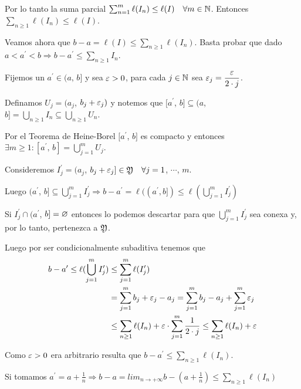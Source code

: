 Por lo tanto la suma parcial \(\sum_{n = 1}^m \ell(I_n) \leq \ell(I) \quad \forall m \in \mathbb{N}\).
Entonces \(\sum_{n \geq 1} \ell(I_n) \leq \ell(I)\).

Veamos ahora que \(b-a = \ell(I) \leq \sum_{n \geq 1} \ell(I_n)\).
Basta probar que dado \(a < a^{\prime} < b \Rightarrow b - a^{\prime} \leq \sum_{n \geq 1} I_n\).

Fijemos un \(a^{\prime} \in (a\text{, } b]\) y sea \(\varepsilon > 0\), para cada \(j \in \mathbb{N}\) sea \(\varepsilon_j = \dfrac{\varepsilon}{2 \cdot j}\).

Definamos \(U_j = (a_j\), \(b_j + \varepsilon_j)\) y notemos que \([a^\prime\), \(b] \subseteq (a\), \(b] = \bigcup_{n \geq 1} I_n \subseteq \bigcup_{n \geq 1} U_n\).

Por el Teorema de Heine-Borel \([a^\prime\), \(b]\) es compacto y entonces \(\exists m \geq 1 : [a^\prime \text{, } b] = \bigcup_{j = 1}^m U_j\).

Consideremos \(I^\prime_j = (a_j\), \(b_j + \varepsilon_j] \in \mathfrak{Y} \quad \forall j = 1\), \(\cdots\), \(m\).

Luego \((a^\prime\), \(b] \subseteq \bigcup_{j = 1}^m I^\prime_j \Rightarrow b - a^\prime = \ell((a^\prime, b]) \leq \ell(\bigcup_{j = 1}^m I^\prime_j)\)

Si \(I^\prime_j \cap (a^\prime\), \(b] = \varnothing\) entonces lo podemos descartar para que \(\bigcup_{j = 1}^m I^\prime_j\) sea conexa y, por lo tanto, pertenezca a \(\mathfrak{Y}\).

Luego por ser condicionalmente subaditiva tenemos que \begin{align*}
    b - a^\prime \leq \ell(\bigcup_{j = 1}^m I^\prime_j) & \leq \sum_{j = 1}^m \ell(I^\prime_j)                                                                              \\
                                                         & = \sum_{j = 1}^m b_j + \varepsilon_j - a_j = \sum_{j = 1}^m b_j - a_j + \sum_{j = 1}^m \varepsilon_j                                \\
                                                         & \leq \sum_{n \geq 1} \ell(I_n) + \varepsilon \cdot \sum_{j = 1}^m \dfrac{1}{2 \cdot j} \leq \sum_{n \geq 1} \ell(I_n) + \varepsilon \\
\end{align*}

Como \(\varepsilon > 0\) era arbitrario resulta que \(b - a^\prime \leq \sum_{n \geq 1} \ell(I_n)\).

Si tomamos \(a^\prime = a + \frac{1}{n} \Rightarrow b-a = lim_{n \to +\infty} b - (a + \frac{1}{n}) \leq \sum_{n \geq 1} \ell(I_n)\)

